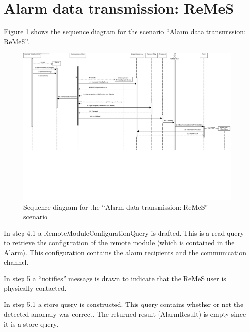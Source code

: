 \section{Alarm data transmission: ReMeS}
\label{scenario:remes-alarm}

\npar Figure \ref{fig:scenario-5-10} shows the sequence diagram for the scenario
``Alarm data transmission: ReMeS''.

\begin{figure}[H]
	\begin{centering}
		\includegraphics[width=\textwidth]{figs/scenario-5-10.pdf}
		\caption{Sequence diagram for the ``Alarm data transmission: ReMeS'' scenario}
		\label{fig:scenario-5-10}
	\end{centering}
\end{figure}

\npar In step 4.1 a RemoteModuleConfigurationQuery is drafted. This is a read
query to retrieve the configuration of the remote module (which is contained in
the Alarm). This configuration contains the alarm recipients and the
communication channel.

\npar In step 5 a ``notifies'' message is drawn to indicate that the ReMeS user
is physically contacted.

\npar In step 5.1 a store query is constructed. This query contains whether or
not the detected anomaly was correct. The returned result (AlarmResult) is empty
since it is a store query.

